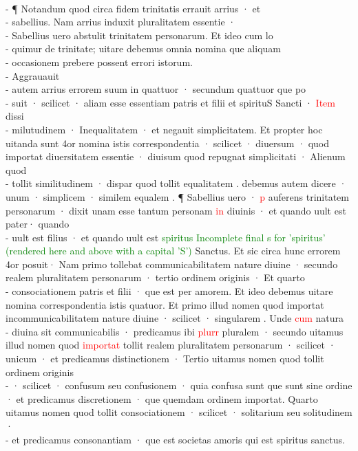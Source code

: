 \documentclass[twoside, openright]{report}
\begin{document}
		 \\ - ¶ Notandum quod circa fidem trinitatis errauit arrius · et \\ - sabellius. Nam arrius induxit pluralitatem essentie · \\ - Sabellius uero abstulit trinitatem personarum. Et ideo cum lo\\ - quimur de trinitate; uitare debemus omnia nomina que aliquam \\ - occasionem prebere possent errori istorum.\\ -  Aggrauauit \\ - autem arrius errorem suum in quattuor · secundum quattuor que po\\ - suit · scilicet · aliam esse essentiam patris et filii et spirituS Sancti · \textcolor{red}{Item} dissi\\ - milutudinem · Inequalitatem · et negauit simplicitatem. Et propter hoc uitanda sunt 4or nomina istis correspondentia · scilicet · diuersum · quod importat diuersitatem essentie · diuisum quod repugnat simplicitati · Alienum quod \\ - tollit similitudinem · dispar quod tollit equalitatem . debemus autem dicere · unum · simplicem · similem equalem . ¶ Sabellius uero · \textcolor{red}{p}  auferens trinitatem personarum · dixit unam esse tantum personam \textcolor{red}{in} diuinis · et quando uult est pater· quando \\ -  uult est filius · et quando uult est  \textcolor{green}{spiritus Incomplete final s for 'spiritus' (rendered here and above with a capital 'S') }  Sanctus. Et sic circa hunc errorem 4or posuit· Nam primo tollebat communicabilitatem nature diuine · secundo realem pluralitatem personarum · tertio ordinem originis · Et quarto \\ - consociationem patris et filii · que est per amorem. Et ideo debemus uitare nomina correspondentia istis quatuor. Et primo illud nomen quod importat incommunicabilitatem nature diuine · scilicet · singularem . Unde \textcolor{red}{cum} natura \\ -  diuina sit communicabilis · predicamus ibi \textcolor{red}{plurr} pluralem ·  secundo uitamus illud nomen quod \textcolor{red}{importat} tollit realem pluralitatem personarum · scilicet · unicum  · et predicamus distinctionem · Tertio uitamus nomen quod tollit ordinem originis \\ - · scilicet · confusum seu confusionem  · quia confusa sunt que sunt sine ordine · et predicamus discretionem  · que quemdam ordinem importat. Quarto uitamus nomen quod tollit consociationem · scilicet · solitarium seu solitudinem · \\ - et predicamus consonantiam · que est societas amoris qui est spiritus sanctus. 
		\pend
	 
    	\endnumbering
     
        
\end{document}
